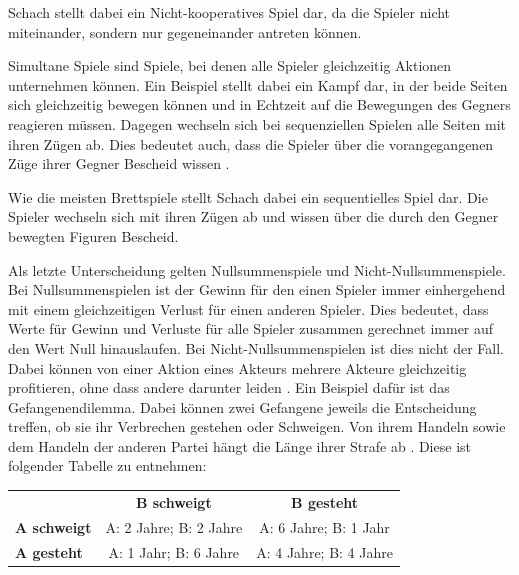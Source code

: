 
Schach stellt dabei ein Nicht-kooperatives Spiel dar, da die Spieler nicht miteinander, sondern nur gegeneinander antreten können.

Simultane Spiele sind Spiele, bei denen alle Spieler gleichzeitig Aktionen unternehmen können. Ein Beispiel stellt dabei ein Kampf dar, in der beide Seiten sich gleichzeitig bewegen können und in Echtzeit auf die Bewegungen des Gegners reagieren müssen. Dagegen wechseln sich bei sequenziellen Spielen  alle Seiten mit ihren Zügen ab. Dies bedeutet auch, dass die Spieler über die vorangegangenen Züge ihrer Gegner Bescheid wissen \cite{Rodriguez}.

Wie die meisten Brettspiele stellt Schach dabei ein sequentielles Spiel dar. Die Spieler wechseln sich mit ihren Zügen ab und wissen über die durch den Gegner bewegten Figuren Bescheid.

Als letzte Unterscheidung gelten Nullsummenspiele und Nicht-Nullsummenspiele. Bei Nullsummenspielen ist der Gewinn für den einen Spieler immer einhergehend mit einem gleichzeitigen Verlust für einen anderen Spieler. Dies bedeutet, dass Werte für Gewinn und Verluste für alle Spieler zusammen gerechnet immer auf den Wert Null hinauslaufen. Bei Nicht-Nullsummenspielen ist dies nicht der Fall. Dabei können von einer Aktion eines Akteurs mehrere Akteure gleichzeitig profitieren, ohne dass andere darunter leiden \cite{Rodriguez}. Ein Beispiel dafür ist das Gefangenendilemma. Dabei können zwei Gefangene jeweils die Entscheidung treffen, ob sie ihr Verbrechen gestehen oder Schweigen. Von ihrem Handeln sowie dem Handeln der anderen Partei hängt die Länge ihrer Strafe ab  \cite{Tweedale1993}. Diese ist folgender Tabelle zu entnehmen:

\begin{tabular}{l c c}
& \textbf{B schweigt} & \textbf{B gesteht} \\
\textbf{A schweigt} & A: 2 Jahre; B: 2 Jahre & A: 6 Jahre; B: 1 Jahr \\
\textbf{A gesteht} & A: 1 Jahr; B: 6 Jahre & A: 4 Jahre; B: 4 Jahre
\end{tabular}


